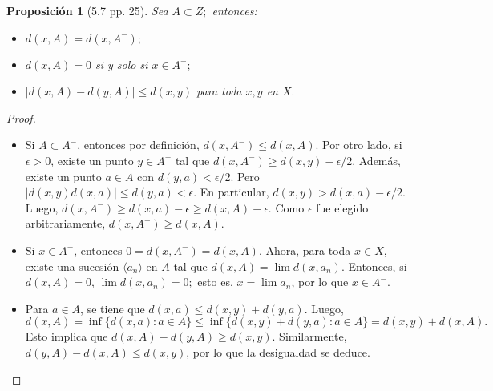 \documentclass[12pt]{article}
\newtheorem*{prop}{Proposición}
\begin{document}
\begin{prop}[5.7 pp. 25]
Sea $A \subset Z;$ entonces: 
\begin{itemize}
    \item[a)] $d(x, A) = d(x, A^-);$
    \item[b)] $d(x, A) = 0$ si y solo si $x \in A^-;$
    \item[c)] $\lvert d(x, A) - d(y, A) \rvert \leq d(x, y)$ para toda $x, y$ en $X.$
\end{itemize}
\end{prop}

\begin{proof} \text{ }
\begin{itemize}
    \item[a)] Si $A \subset A^-$, entonces por definición,  $d(x, A^-) \leq d(x, A).$ Por otro lado, si $\epsilon > 0$, existe un punto $y \in A^-$ tal que $d(x, A^-) \geq d(x, y) - \epsilon/2$. Además, existe un punto $a \in A$ con $d(y, a) < \epsilon /2$. Pero $\lvert d(x, y) d(x, a) \rvert \leq d(y, a) < \epsilon.$ En particular, $d(x, y) > d(x, a) - \epsilon/2$. Luego, $d(x, A^-) \geq d(x, a) - \epsilon \geq d(x, A) - \epsilon.$ Como $\epsilon$ fue elegido arbitrariamente, $d(x, A^-) \geq d(x, A).$
    
    \item[b)] Si $x \in A^-$, entonces $0 = d(x, A^-) = d(x, A).$ Ahora, para toda $x \in X$, existe una sucesión $\langle a_n \rangle$ en $A$ tal que $d(x, A) = \lim d(x, a_n).$ Entonces, si $d(x, A) = 0$, $\lim d(x, a_n) = 0;$ esto es, $x = \lim a_n$, por lo que $x \in A^-.$
    
    \item[c)] Para $a \in A$, se tiene que $d(x, a) \leq d(x, y) + d(y, a).$ Luego, $d(x, A) = \inf \{d(x, a): a \in A\} \leq \inf \{d(x, y) + d(y, a): a \in A \} = d(x, y) + d(x, A).$ Esto implica que $d(x, A) - d(y, A) \geq d(x, y).$ Similarmente, $d(y, A) - d(x, A) \leq d(x, y)$, por lo que la desigualdad se deduce. 
\end{itemize}
\end{proof}

\printbibliography
\end{document}
